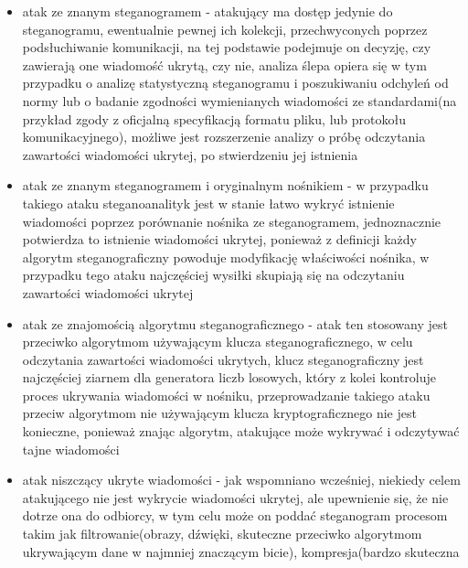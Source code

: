 \documentclass[a4paper, twoside]{report}
\begin{document}
        \begin{itemize}
            \item atak ze znanym steganogramem - atakujący ma dostęp jedynie do
                steganogramu, ewentualnie pewnej ich kolekcji, przechwyconych poprzez
                podsłuchiwanie komunikacji, na tej podstawie podejmuje on decyzję,
                czy zawierają one wiadomość ukrytą, czy nie, analiza ślepa opiera
                się w tym przypadku o analizę statystyczną steganogramu i poszukiwaniu
                odchyleń od normy lub o badanie zgodności wymienianych wiadomości
                ze standardami(na przykład zgody z oficjalną specyfikacją formatu pliku,
                lub protokołu komunikacyjnego), możliwe jest rozszerzenie
                analizy o próbę odczytania zawartości wiadomości ukrytej, po stwierdzeniu
                jej istnienia
            \item atak ze znanym steganogramem i oryginalnym nośnikiem - w przypadku
                takiego ataku steganoanalityk jest w stanie łatwo wykryć istnienie
                wiadomości poprzez porównanie nośnika ze steganogramem, jednoznacznie
                potwierdza to istnienie wiadomości ukrytej, ponieważ z definicji
                każdy algorytm steganograficzny powoduje modyfikację właściwości
                nośnika, w przypadku tego ataku najczęściej wysiłki skupiają się
                na odczytaniu zawartości wiadomości ukrytej
            \item atak ze znajomością algorytmu steganograficznego - atak ten
                stosowany jest przeciwko algorytmom używającym klucza steganograficznego,
                w celu odczytania zawartości wiadomości ukrytych, klucz steganograficzny
                jest najczęściej ziarnem dla generatora liczb losowych, który z
                kolei kontroluje proces ukrywania wiadomości w nośniku, przeprowadzanie
                takiego ataku przeciw algorytmom nie używającym klucza kryptograficznego
                nie jest konieczne, ponieważ znając algorytm, atakujące może wykrywać i
                odczytywać tajne wiadomości
            \item atak niszczący ukryte wiadomości - jak wspomniano wcześniej, niekiedy
                celem atakującego nie jest wykrycie wiadomości ukrytej, ale upewnienie
                się, że nie dotrze ona do odbiorcy, w tym celu może on poddać steganogram
                procesom takim jak filtrowanie(obrazy, dźwięki, skuteczne przeciwko
                algorytmom ukrywającym dane w najmniej znaczącym bicie), kompresja(bardzo skuteczna

\end{itemize}
\end{document}
